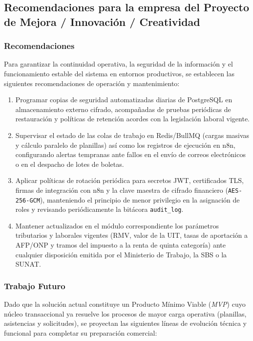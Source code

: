 \subsection{Recomendaciones para la empresa del Proyecto de Mejora / Innovación / Creatividad}

\subsubsection{Recomendaciones}
Para garantizar la continuidad operativa, la seguridad de la información y el funcionamiento 
estable del sistema en entornos productivos, se establecen las siguientes recomendaciones de operación y mantenimiento:

\begin{enumerate}[leftmargin=*]
    \item Programar copias de seguridad automatizadas diarias 
    de PostgreSQL en almacenamiento externo cifrado, acompañadas de pruebas periódicas de restauración y 
    políticas de retención acordes con la legislación laboral vigente.

    \item Supervisar el estado de las colas de trabajo en Redis/BullMQ 
    (cargas masivas y cálculo paralelo de planillas) así como los registros de ejecución en n8n, 
    configurando alertas tempranas ante fallos en el envío de correos electrónicos o en el despacho de lotes de boletas.

    \item Aplicar políticas de rotación periódica para secretos JWT, 
    certificados TLS, firmas de integración con n8n y la clave maestra de cifrado financiero (\texttt{AES-256-GCM}), 
    manteniendo el principio de menor privilegio en la asignación de roles y revisando periódicamente la bitácora \texttt{audit\_log}.

    \item Mantener actualizados en el módulo correspondiente los 
    parámetros tributarios y laborales vigentes (RMV, valor de la UIT, tasas de aportación a AFP/ONP y 
    tramos del impuesto a la renta de quinta categoría) ante cualquier disposición emitida por el Ministerio de Trabajo, la SBS o la SUNAT.
\end{enumerate}

\subsubsection{Trabajo Futuro}
Dado que la solución actual constituye un Producto Mínimo Viable (\textit{MVP}) 
cuyo núcleo transaccional ya resuelve los procesos de mayor carga operativa (planillas, asistencias y solicitudes), 
se proyectan las siguientes líneas de evolución técnica y funcional para completar su preparación comercial:

